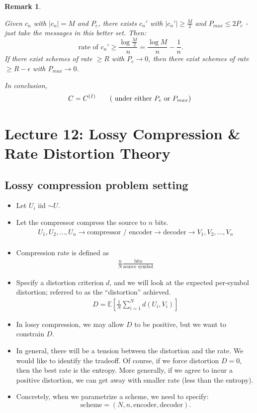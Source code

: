 \documentclass[13pt]{article}
\newtheorem*{remark}{Remark}
\newcommand{\EE}{\mathbb{E}}
\newcommand{\eps}{\epsilon}
\newcommand{\T}{\text}
\begin{document}
\begin{remark}
\begin{enumerate}
      Given $c_n$ with $|c_n| = M$ and $P_e$, there exists $c_n'$ with $|c_n'| \geq \frac{M}{2}$ and $P_{max} \leq 2 P_e$ - just take the messages in this better set.  Then:
      \[
        \text{ rate of $c_n'$} \geq \frac{\log \frac{M}{2}}{n} = \frac{\log M}{n} - \frac{1}{n}.
      \]
      If there exist schemes of rate $\geq R$ with $P_e \to 0$, then there exist schemes of rate $\geq R - \eps$ with $P_{max} \to 0$.

      In conclusion, 
      \[
        C = C^{(I)} \tag{ under either $P_e$ or $P_{max}$}
      \]
  \end{enumerate}
\end{remark}

\section{Lecture 12: Lossy Compression \& Rate Distortion Theory}

\subsection{Lossy compression problem setting}

\begin{itemize}
  \item Let $U_i$ iid $\sim U$.
  \item Let the compressor compress the source to $n$ bits.
\begin{align*}
  U_1, U_2, \dots, U_n \to \T{compressor / encoder} \to \T{decoder} \to V_1, V_2, \dots, V_n \\
\end{align*}
  \item Compression rate is defined as
    \begin{align*}
      \frac{n}{N} \frac{\T{bits}}{\T{source symbol}}
    \end{align*}
  \item Specify a distortion criterion $d$, and we will look at the expected per-symbol distortion; referred to as the ``distortion'' achieved.
    \begin{align*}
      D = \EE \left [ \frac{1}{N} \sum_{i=1}^{N} d(U_i, V_i) \right ]
    \end{align*}
  \item In lossy compression, we may allow $D$ to be positive, but we want to constrain $D$.
  \item In general, there will be a tension between the distortion and the rate.  We would like to identify the tradeoff.  Of course, if we force distortion $D = 0$, then the best rate is the entropy.  More generally, if we agree to incur a positive distortion, we can get away with smaller rate (less than the entropy).
  \item Concretely, when we parametrize a scheme, we need to specify:
    \[
      \T{scheme} = (N, n, \T{encoder}, \T{decoder}).
    \]
\end{itemize}
\end{document}
